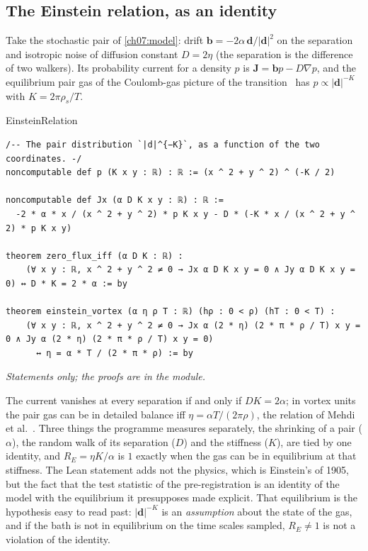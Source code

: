 \subsection*{The Einstein relation, as an identity}

Take the stochastic pair of \cref{ch07:model}: drift $\mathbf b=-2\alpha\,\mathbf d/|\mathbf d|^2$ on the separation and isotropic noise of diffusion constant $D=2\eta$ (the separation is the difference of two walkers). Its probability current for a density $p$ is $\mathbf J=\mathbf bp-D\nabla p$, and the equilibrium pair gas of the Coulomb-gas picture of the
transition~\cite{KosterlitzThouless1973} has $p\propto|\mathbf d|^{-K}$ with $K=2\pi\rho_s/T$.

\begin{leanbox}{EinsteinRelation}
\begin{lstlisting}[style=lean,basicstyle=\ttfamily\footnotesize]
/-- The pair distribution `|d|^{−K}`, as a function of the two coordinates. -/
noncomputable def p (K x y : ℝ) : ℝ := (x ^ 2 + y ^ 2) ^ (-K / 2)

noncomputable def Jx (α D K x y : ℝ) : ℝ :=
  -2 * α * x / (x ^ 2 + y ^ 2) * p K x y - D * (-K * x / (x ^ 2 + y ^ 2) * p K x y)

theorem zero_flux_iff (α D K : ℝ) :
    (∀ x y : ℝ, x ^ 2 + y ^ 2 ≠ 0 → Jx α D K x y = 0 ∧ Jy α D K x y = 0) ↔ D * K = 2 * α := by

theorem einstein_vortex (α η ρ T : ℝ) (hρ : 0 < ρ) (hT : 0 < T) :
    (∀ x y : ℝ, x ^ 2 + y ^ 2 ≠ 0 → Jx α (2 * η) (2 * π * ρ / T) x y = 0 ∧ Jy α (2 * η) (2 * π * ρ / T) x y = 0)
      ↔ η = α * T / (2 * π * ρ) := by
\end{lstlisting}
\nopagebreak[4]\smallskip\noindent\textit{Statements only; the proofs are in the module.}
\end{leanbox}

The current vanishes at every separation if and only if $DK=2\alpha$; in vortex units the pair gas can be in detailed balance iff $\eta=\alpha T/(2\pi\rho)$, the relation of Mehdi et al.~\cite{Mehdi2023}. Three things the programme measures separately, the shrinking of a pair ($\alpha$), the random walk of its separation ($D$) and the stiffness ($K$), are tied by one identity, and
$R_E=\eta K/\alpha$ is $1$ exactly when the gas can be in equilibrium at that stiffness. The Lean statement adds not the physics, which is Einstein's of 1905, but the fact that the test statistic of the pre-registration is an identity of the model with the equilibrium it presupposes made explicit. That equilibrium is the hypothesis easy to read past: $|\mathbf d|^{-K}$ is an \emph{assumption} about the
state of the gas, and if the bath is not in equilibrium on the time scales sampled, $R_E\neq1$ is not a violation of the identity.

